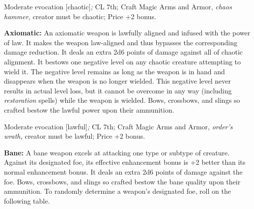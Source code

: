 Moderate evocation [chaotic]\textit{; }CL 7th; Craft Magic Arms and Armor, \textit{chaos 
hammer, }creator must be chaotic; Price +2 bonus.

\textbf{Axiomatic:} An axiomatic weapon is lawfully aligned and infused with the 
power of law. It makes the weapon law-aligned and thus bypasses the corresponding 
damage reduction. It deals an extra 2d6 points of damage against all of chaotic 
alignment. It bestows one negative level on any chaotic creature attempting to 
wield it. The negative level remains as long as the weapon is in hand and disappears 
when the weapon is no longer wielded. This negative level never results in actual 
level loss, but it cannot be overcome in any way (including \textit{restoration 
}spells) while the weapon is wielded. Bows, crossbows, and slings so crafted bestow 
the lawful power upon their ammunition.

Moderate evocation [lawful]\textit{; }CL 7th; Craft Magic Arms and Armor, \textit{order's 
wrath, }creator must be lawful; Price +2 bonus.

\textbf{Bane:} A bane weapon excels at attacking one type or subtype of creature. 
Against its designated foe, its effective enhancement bonus is +2 better than its 
normal enhancement bonus. It deals an extra 2d6 points of damage against the foe. 
Bows, crossbows, and slings so crafted bestow the bane quality upon their ammunition. 
To randomly determine a weapon's designated foe, roll on the following table.

